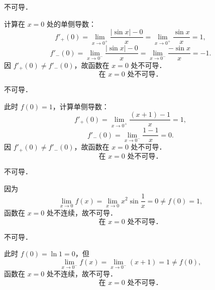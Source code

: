 \begin{solution}
     不可导．

    计算在 $x = 0$ 处的单侧导数：
    \begin{equation}
        f'_+(0) = \lim_{x\to 0^+} \frac{|\sin x| - 0}{x} = \lim_{x\to 0^+} \frac{\sin x}{x} = 1,
    \end{equation}
    \begin{equation}
        f'_-(0) = \lim_{x\to 0^-} \frac{|\sin x| - 0}{x} = \lim_{x\to 0^-} \frac{-\sin x}{x} = -1.
    \end{equation}
    因 $f'_+(0) \neq f'_-(0)$，故函数在 $x = 0$ 处不可导．
    \begin{equation}
        \boxed{\text{在 } x = 0 \text{ 处不可导．}}
    \end{equation}

     不可导．

    此时 $f(0) = 1$，计算单侧导数：
    \begin{equation}
        f'_+(0) = \lim_{x\to 0^+} \frac{(x + 1) - 1}{x} = 1,
    \end{equation}
    \begin{equation}
        f'_-(0) = \lim_{x\to 0^-} \frac{1 - 1}{x} = 0.
    \end{equation}
    因 $f'_+(0) \neq f'_-(0)$，故函数在 $x = 0$ 处不可导．
    \begin{equation}
        \boxed{\text{在 } x = 0 \text{ 处不可导．}}
    \end{equation}

     不可导．

    因为
    \begin{equation}
        \lim_{x\to 0} f(x) = \lim_{x\to 0} x^2 \sin \frac{1}{x} = 0 \neq f(0) = 1,
    \end{equation}
    函数在 $x = 0$ 处不连续，故不可导．
    \begin{equation}
        \boxed{\text{在 } x = 0 \text{ 处不可导．}}
    \end{equation}

     不可导．

    此时 $f(0) = \ln 1 = 0$，但
    \begin{equation}
        \lim_{x\to 0^-} f(x) = \lim_{x\to 0^-} (x + 1) = 1 \neq f(0),
    \end{equation}
    函数在 $x = 0$ 处不连续，故不可导．
    \begin{equation}
        \boxed{\text{在 } x = 0 \text{ 处不可导．}}
    \end{equation}


\end{solution}
